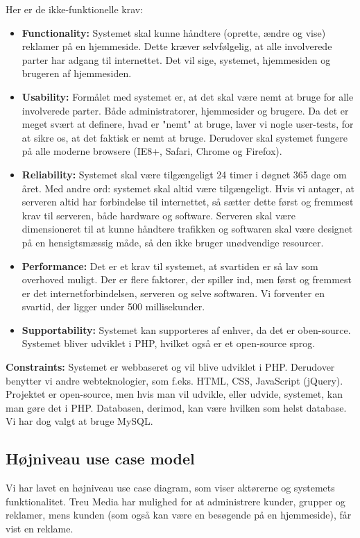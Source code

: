 \documentclass[a4paper,12pt]{article}
\begin{document}
Her er de ikke-funktionelle krav:
\begin{itemize}
	\item \textbf{Functionality:} Systemet skal kunne håndtere (oprette, ændre og vise) reklamer på en hjemmeside. Dette kræver selvfølgelig, at alle involverede parter har adgang til internettet. Det vil sige, systemet, hjemmesiden og brugeren af hjemmesiden.
	\item \textbf{Usability:} Formålet med systemet er, at det skal være nemt at bruge for alle involverede parter. Både administratorer, hjemmesider og brugere. Da det er meget svært at definere, hvad er "nemt" at bruge, laver vi nogle user-tests, for at sikre os, at det faktisk er nemt at bruge. Derudover skal systemet fungere på alle moderne browsere (IE8+, Safari, Chrome og Firefox).
	\item \textbf{Reliability:} Systemet skal være tilgængeligt 24 timer i døgnet 365 dage om året. Med andre ord: systemet skal altid være tilgængeligt. Hvis vi antager, at serveren altid har forbindelse til internettet, så sætter dette først og fremmest krav til serveren, både hardware og software. Serveren skal være dimensioneret til at kunne håndtere trafikken og softwaren skal være designet på en hensigtsmæssig måde, så den ikke bruger unødvendige resourcer.
	\item \textbf{Performance:} Det er et krav til systemet, at svartiden er så lav som overhoved muligt. Der er flere faktorer, der spiller ind, men først og fremmest er det internetforbindelsen, serveren og selve softwaren. Vi forventer en svartid, der ligger under 500 millisekunder.
	\item \textbf{Supportability:} Systemet kan supporteres af enhver, da det er oben-source. Systemet bliver udviklet i PHP, hvilket også er et open-source sprog.
\end{itemize}

\textbf{Constraints:} Systemet er webbaseret og vil blive udviklet i PHP. Derudover benytter vi andre webteknologier, som f.eks. HTML, CSS, JavaScript (jQuery). Projektet er open-source, men hvis man vil udvikle, eller udvide, systemet, kan man gøre det i PHP. Databasen, derimod, kan være hvilken som helst database. Vi har dog valgt at bruge MySQL.

\subsection{Højniveau use case model}
Vi har lavet en højniveau use case diagram, som viser aktørerne og systemets funktionalitet. Treu Media har mulighed for at administrere kunder, grupper og reklamer, mens kunden (som også kan være en besøgende på en hjemmeside), får vist en reklame.
\end{document}
